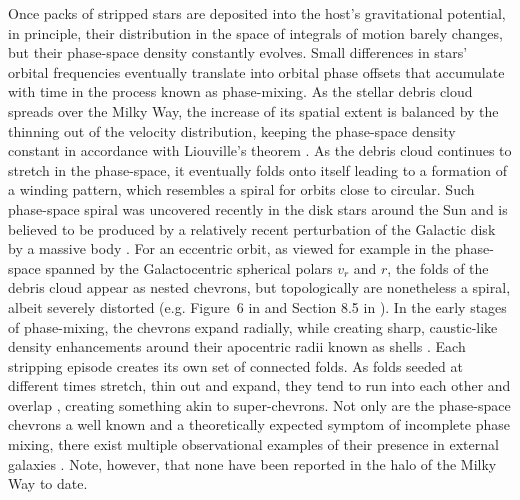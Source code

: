 \documentclass[a4paper,useAMS,usenatbib]{mnras}
\begin{document}
Once packs of stripped stars are deposited into the host's gravitational potential, in principle, their distribution in the space of integrals of motion barely changes, but their phase-space density constantly evolves. Small differences in stars' orbital frequencies eventually translate into orbital phase offsets that accumulate with time in the process known as phase-mixing. As the stellar debris cloud spreads over the Milky Way, the increase of its spatial extent is balanced by the thinning out of the velocity distribution, keeping the phase-space density constant in accordance with Liouville's theorem \citep[see][]{HelmiWhite1999}. As the debris cloud continues to stretch in the phase-space, it eventually folds onto itself leading to a formation of a winding pattern, which resembles a spiral for orbits close to circular. Such phase-space spiral was uncovered recently in the disk stars around the Sun and is believed to be produced by a relatively recent perturbation of the Galactic disk by a massive body \citep[see][]{Antoja2018}. For an eccentric orbit, as viewed for example in the phase-space spanned by the Galactocentric spherical polars $v_r$ and $r$, the folds of the debris cloud appear as nested chevrons, but topologically are nonetheless a spiral, albeit severely distorted (e.g. Figure~6 in \citet{Quinn1984} and Section 8.5 in \citet{BT}). In the early stages of  phase-mixing, the chevrons expand radially, while creating sharp, caustic-like density enhancements around their apocentric radii known as shells \citep[][]{Sanderson2013}. Each stripping episode creates its own set of connected folds. As folds seeded at different times stretch, thin out and expand, they tend to run into each other and overlap \citep[see][]{DongPaez2022}, creating something akin to super-chevrons. Not only are the phase-space chevrons a well known and a theoretically expected symptom of incomplete phase mixing, there exist multiple observational examples of their presence in external galaxies \citep[see e.g.][]{Ebrova2012,Romanowsky2012,Foster2014,Longobardi2015}. Note, however, that none have been reported in the halo of the Milky Way to date.
\end{document}
